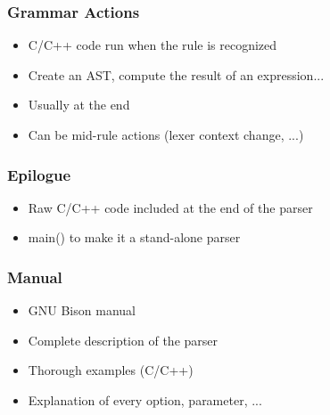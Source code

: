 \begin{frame}
  \frametitle{Grammar Actions}
    \begin{itemize}[<+->]
      \item C/C++ code run when the rule is recognized
      \item Create an AST, compute the result of an expression...
      \item Usually at the end
      \item Can be mid-rule actions (lexer context change, ...)
    \end{itemize}
\end{frame}


\begin{frame}
  \frametitle{Epilogue}
    \begin{itemize}[<+->]
      \item Raw C/C++ code included at the end of the parser
      \item main() to make it a stand-alone parser
    \end{itemize}
\end{frame}


\begin{frame}
  \frametitle{Manual}
    \begin{itemize}[<+->]
      \item GNU Bison manual
      \item Complete description of the parser
      \item Thorough examples (C/C++)
      \item Explanation of every option, parameter, ...
    \end{itemize}
\end{frame}



